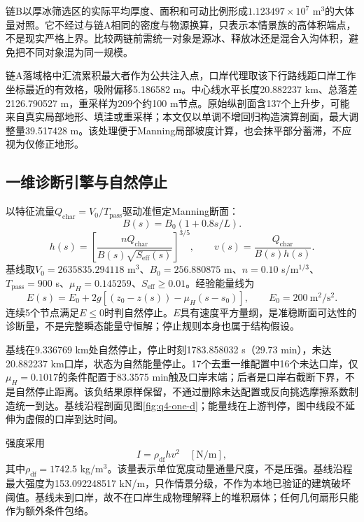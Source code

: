 链B以厚冰筛选区的实际平均厚度、面积和可动比例形成$1.123497\times10^7$ m$^3$的大体量对照。它不经过与链A相同的密度与物源换算，只表示本情景族的高体积端点，不是现实严格上界。比较两链前需统一对象是源冰、释放冰还是混合入沟体积，避免把不同对象混为同一规模。

链A落域格中汇流累积最大者作为公共注入点，口岸代理取该下行路线距口岸工作坐标最近的有效格，吸附偏移5.186582 m。中心线水平长度20.882237 km、总落差2126.790527 m，重采样为209个约100 m节点。原始纵剖面含137个上升步，可能来自真实局部地形、填洼或重采样；本文仅以单调不增回归构造演算剖面，最大调整量39.517428 m。该处理便于Manning局部坡度计算，也会抹平部分蓄滞，不应视为仅修正地形。

\subsection{一维诊断引擎与自然停止}
以特征流量$Q_{\mathrm{char}}=V_0/T_{\mathrm{pass}}$驱动准恒定Manning断面\cite{chow1959}：
\begin{equation}
B(s)=B_0(1+0.8s/L).
\end{equation}
\begin{equation}
h(s)=\left[\frac{nQ_{\mathrm{char}}}{B(s)\sqrt{S_{\mathrm{eff}}(s)}}\right]^{3/5},
\qquad
v(s)=\frac{Q_{\mathrm{char}}}{B(s)h(s)}.
\end{equation}
基线取$V_0=2635835.294118$ m$^3$、$B_0=256.880875$ m、$n=0.10$ s/m$^{1/3}$、$T_{\mathrm{pass}}=900$ s、$\mu_H=0.145259$、$S_{\mathrm{eff}}\ge0.01$。经验能量线为
\begin{equation}
E(s)=E_0+2g\left[(z_0-z(s))-\mu_H(s-s_0)\right],
\qquad E_0=200\ \mathrm{m^2/s^2}.
\end{equation}
连续5个节点满足$E\le0$时判自然停止。$E$具有速度平方量纲，是准稳断面可达性的诊断量，不是完整瞬态能量守恒解；停止规则本身也属于结构假设。

基线在9.336769 km处自然停止，停止时刻1783.858032 s（29.73 min），未达20.882237 km口岸，状态为自然能量停止。17个去重一维配置中16个未达口岸，仅$\mu_H=0.1017$的条件配置于83.3575 min触及口岸末端；后者是口岸右截断下界，不是自然停止距离。该负结果原样保留，不通过删除未达配置或反向挑选摩擦系数制造统一到达。基线沿程剖面见图\ref{fig:q4-one-d}；能量线在上游判停，图中线段不延伸为虚假的口岸到达时间。


强度采用
\begin{equation}
I=\rho_{\mathrm{df}}hv^2\quad[\mathrm{N/m}],
\end{equation}
其中$\rho_{\mathrm{df}}=1742.5$ kg/m$^3$。该量表示单位宽度动量通量尺度，不是压强。基线沿程最大强度为153.092248517 kN/m，只作情景分级，不作为本地已验证的建筑破坏阈值。基线未到口岸，故不在口岸生成物理解释上的堆积扇体；任何几何扇形只能作为额外条件包络。

